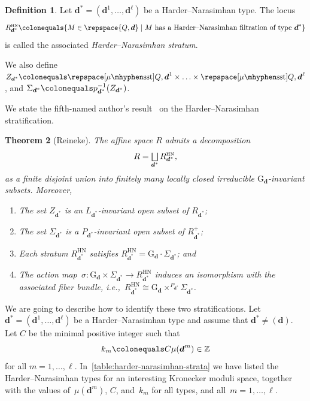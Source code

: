 \documentclass[JEP,XML,SOM,Unicode,NoEqCountersInSection,published]{cedram}
\let\oldbigsqcup\bigsqcup
\renewcommand{\bigsqcup}{\mathop{\textstyle\oldbigsqcup}\displaylimits}
\theoremstyle{plain}
\newtheorem{theorem}{Theorem}[section]
\theoremstyle{definition}
\newtheorem{definition}[theorem]{Definition}
\newcommand\blade[1][]{\Sigma_{#1}}
\newcommand\group[1][\tuple{d}]{\mathrm{G}_{#1}}
\newcommand\HN{\ensuremath{{\scriptscriptstyle\mathrm{HN}}}}
\newcommand\semistable{\ensuremath{\mhyphen\mathrm{sst}}}
\newcommand\tuple[1]{\ensuremath{{\boldsymbol{#1}}}}
\begin{document}
\begin{definition}
\label{definition:harder-narasimhan-strata}
Let $\tuple{d}^* = (\tuple{d}^1,\ldots,\tuple{d}^\ell)$ be a Harder--Narasimhan type.
The locus
\begin{equation*}
R_{\tuple{d}^*}^{\HN} \colonequals \{ M \in \repspace{Q,\tuple{d}} \mid \text{$M$ has a Harder--Narasimhan filtration of type $\tuple{d}^*$}\}
\end{equation*}
is called the associated \emph{Harder--Narasimhan stratum}.

We also define $Z_{\tuple{d}^*} \colonequals \repspace[\mu\semistable]{Q,\tuple{d}^1} \times \ldots \times \repspace[\mu\semistable]{Q,\tuple{d}^\ell}$,
and $\blade[\tuple{d}^*] \colonequals p_{\tuple{d}^*}^{-1}(Z_{\tuple{d}^*})$.
\end{definition}

We state the fifth-named author's result~\cite[Prop.\,3.4]{MR1974891} on the Harder--Nara\-sim\-han stratification.

\begin{theorem}[Reineke]
\label{theorem:HN-stratification}
The affine space $R$ admits a decomposition
\begin{equation*}
R = \bigsqcup_{\tuple{d}^*} R_{\tuple{d}^*}^{\HN},
\end{equation*}
as a finite disjoint union into finitely many locally closed irreducible $\group$-invariant subsets. Moreover,
\begin{enumerate}
\item The set $Z_{\tuple{d}^*}$ is an $L_{\tuple{d}^*}$-invariant open subset of $R_{\tuple{d}^*}$;
\item The set $\blade[\tuple{d}^*]$ is a $P_{\tuple{d}^*}$-invariant open subset of $R_{\tuple{d}^*}^+$;
\item Each stratum $R_{\tuple{d}^*}^{\HN}$ satisfies $R_{\tuple{d}^*}^{\HN} = {\group}\cdot \blade[\tuple{d}^*]$; and
\item \label{item:action-map} The action map~$\sigma\colon\group \times \blade[\tuple{d}^*] \to R_{\tuple{d}^*}^{\HN}$
induces an isomorphism with the associated fiber bundle,
i.e.,~$R_{\tuple{d}^*}^{\HN} \cong \group \times^{P_{\tuple{d}^*}} \blade[\tuple{d}^*]$.
\end{enumerate}
\end{theorem}

We are going to describe how to identify these two stratifications.
Let $\tuple{d}^* = (\tuple{d}^1,\ldots,\tuple{d}^\ell)$ be a Harder--Narasimhan type
and assume that $\tuple{d}^* \neq (\tuple{d})$.
Let $C$ be the minimal positive integer such that
\begin{equation}
\label{equation:ks}
k_m\colonequals C\mu(\tuple{d}^m) \in \mathbb{Z}
\end{equation}
for all $m=1,\ldots,\ell$. In~\cref{table:harder-narasimhan-strata} we have listed the Harder--Narasimhan types
for an interesting Kronecker moduli space,
together with the values of~$\mu(\tuple{d}^m)$, $C$, and~$k_m$
for all types, and all~$m=1,\ldots,\ell$.
\end{document}
